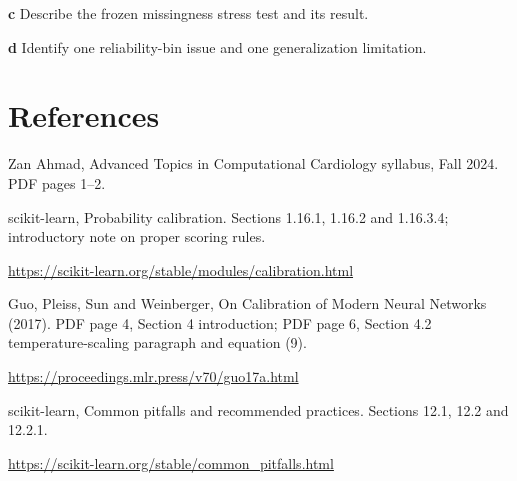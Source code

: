 \documentclass[11pt,letterpaper]{article}
\theoremstyle{definition}\newtheorem{definition}{Definition}\newtheorem{example}{Example}
\numberwithin{equation}{section}
\begin{document}
\textbf{c} Describe the frozen missingness stress test and its result.

\textbf{d} Identify one reliability-bin issue and one generalization limitation.

\section*{References}
\noindent\begin{minipage}{\linewidth}
Zan Ahmad, Advanced Topics in Computational Cardiology syllabus, Fall 2024. PDF pages 1--2.

\end{minipage}\par\medskip
\noindent\begin{minipage}{\linewidth}
scikit-learn, Probability calibration. Sections 1.16.1, 1.16.2 and 1.16.3.4; introductory note on proper scoring rules.

\url{https://scikit-learn.org/stable/modules/calibration.html}
\end{minipage}\par\medskip
\noindent\begin{minipage}{\linewidth}
Guo, Pleiss, Sun and Weinberger, On Calibration of Modern Neural Networks (2017). PDF page 4, Section 4 introduction; PDF page 6, Section 4.2 temperature-scaling paragraph and equation (9).

\url{https://proceedings.mlr.press/v70/guo17a.html}
\end{minipage}\par\medskip
\noindent\begin{minipage}{\linewidth}
scikit-learn, Common pitfalls and recommended practices. Sections 12.1, 12.2 and 12.2.1.

\url{https://scikit-learn.org/stable/common_pitfalls.html}
\end{minipage}\par\medskip
\end{document}
